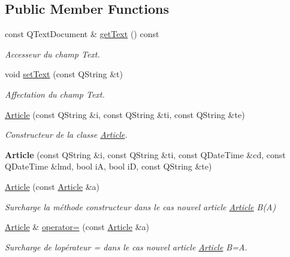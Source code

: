 \subsection*{Public Member Functions}
\begin{DoxyCompactItemize}
\item 
const Q\+Text\+Document \& \hyperlink{class_article_a178a250fddb6c30288d893f4f3439ca8}{get\+Text} () const
\begin{DoxyCompactList}\small\item\em Accesseur du champ Text. \end{DoxyCompactList}\item 
void \hyperlink{class_article_a7144942027b1761cfcbd21761dd5cee8}{set\+Text} (const Q\+String \&t)
\begin{DoxyCompactList}\small\item\em Affectation du champ Text. \end{DoxyCompactList}\item 
\hyperlink{class_article_af3f6b98ba3cc46aaa5625a17266eb67f}{Article} (const Q\+String \&i, const Q\+String \&ti, const Q\+String \&te)
\begin{DoxyCompactList}\small\item\em Constructeur de la classe \hyperlink{class_article}{Article}. \end{DoxyCompactList}\item 
\mbox{\label{class_article_a067e635213e9ff6b93fd8f88e471652f}} 
{\bfseries Article} (const Q\+String \&i, const Q\+String \&ti, const Q\+Date\+Time \&cd, const Q\+Date\+Time \&lmd, bool iA, bool iD, const Q\+String \&te)
\item 
\mbox{\label{class_article_a77eaa1a87e24eec7788f438a30ff162f}} 
\hyperlink{class_article_a77eaa1a87e24eec7788f438a30ff162f}{Article} (const \hyperlink{class_article}{Article} \&a)
\begin{DoxyCompactList}\small\item\em Surcharge la méthode constructeur dans le cas nouvel article \hyperlink{class_article}{Article} B(\+A) \end{DoxyCompactList}\item 
\hyperlink{class_article}{Article} \& \hyperlink{class_article_ae4059abc035598ff3faf554fd74a1492}{operator=} (const \hyperlink{class_article}{Article} \&a)
\begin{DoxyCompactList}\small\item\em Surcharge de l\textquotesingle{}opérateur = dans le cas nouvel article \hyperlink{class_article}{Article} B=A. \end{DoxyCompactList}\item 

\end{DoxyCompactItemize}
